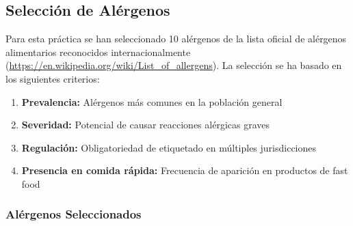 \documentclass[12pt,a4paper]{article}
\begin{document}
\subsection{Selección de Alérgenos}

Para esta práctica se han seleccionado 10 alérgenos de la lista oficial de alérgenos alimentarios reconocidos internacionalmente (\url{https://en.wikipedia.org/wiki/List_of_allergens}). La selección se ha basado en los siguientes criterios:

\begin{enumerate}
    \item \textbf{Prevalencia:} Alérgenos más comunes en la población general
    \item \textbf{Severidad:} Potencial de causar reacciones alérgicas graves
    \item \textbf{Regulación:} Obligatoriedad de etiquetado en múltiples jurisdicciones
    \item \textbf{Presencia en comida rápida:} Frecuencia de aparición en productos de fast food
\end{enumerate}

\subsubsection{Alérgenos Seleccionados}
\end{document}
